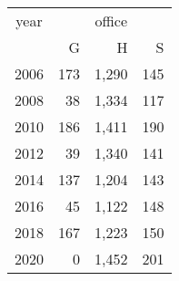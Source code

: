 \footnotesize\begin{tabular}[t]{lrrr}
\toprule
\multicolumn{1}{c}{year} & \multicolumn{3}{c}{office} \\
\cmidrule(l{3pt}r{3pt}){1-1} \cmidrule(l{3pt}r{3pt}){2-4}
  & G & H & S\\
\midrule
2006 & 173 & 1,290 & 145\\
2008 & 38 & 1,334 & 117\\
2010 & 186 & 1,411 & 190\\
2012 & 39 & 1,340 & 141\\
2014 & 137 & 1,204 & 143\\
2016 & 45 & 1,122 & 148\\
2018 & 167 & 1,223 & 150\\
2020 & 0 & 1,452 & 201\\
\bottomrule
\end{tabular}
